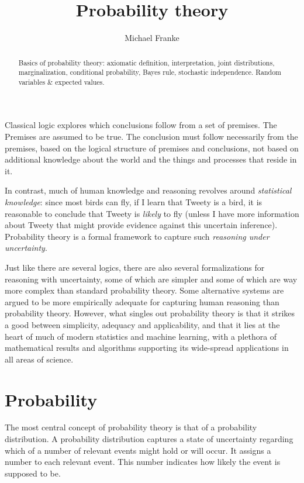 \documentclass[nobib,nofonts]{tufte-handout}
\title{Probability theory}
\author[M.~Franke]{Michael Franke}
\date{} %
\begin{document}
\maketitle

\begin{abstract}
\noindent
Basics of probability theory:
axiomatic definition,
interpretation,
joint distributions,
marginalization,
conditional probability,
Bayes rule,
stochastic independence.
Random variables \& expected values.
\end{abstract}


\noindent Classical logic explores which conclusions follow from a set of premises.
The Premises are assumed to be true.
The conclusion must follow necessarily from the premises, based on the logical structure of premises and conclusions, not based on additional knowledge about the world and the things and processes that reside in it.

In contrast, much of human knowledge and reasoning revolves around \emph{statistical knowledge}: since most birds can fly, if I learn that Tweety is a bird, it is reasonable to conclude that Tweety is \emph{likely} to fly (unless I have more information about Tweety that might provide evidence against this uncertain inference).
Probability theory is a formal framework to capture such \emph{reasoning under uncertainty}.

Just like there are several logics, there are also several formalizations for reasoning with uncertainty, some of which are simpler and some of which are way more complex than standard probability theory.
Some alternative systems are argued to be more empirically adequate for capturing human reasoning than probability theory.
However, what singles out probability theory is that it strikes a good between simplicity, adequacy and applicability, and that it lies at the heart of much of modern statistics and machine learning, with a plethora of mathematical results and algorithms supporting its wide-spread applications in all areas of science.

\section{Probability}

The most central concept of probability theory is that of a probability distribution.
A probability distribution captures a state of uncertainty regarding which of a number of relevant events might hold or will occur.
It assigns a number to each relevant event.
This number indicates how likely the event is supposed to be.
\end{document}
